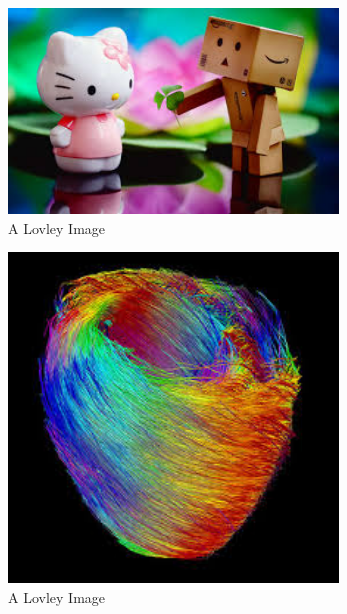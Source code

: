 \documentclass[report]{IEEEtran}
\begin{document}
\begin{figure}[h]
\centering
	\includegraphics[width = 8.75cm]{image2}
	\caption{A Lovley Image}
		
\end{figure}

\begin{figure}[h]
\centering
	\includegraphics[width = 8.75cm]{image1}
	\caption{A Lovley Image}
		
\end{figure}
\end{document}
